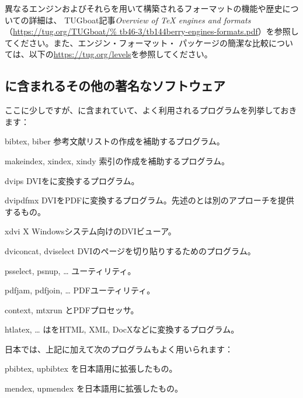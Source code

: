 \documentclass[uplatex,dvipdfmx,12pt,tombow]{jsarticle}
\begin{document}
異なるエンジンおよびそれらを用いて構築されるフォーマットの機能や歴史についての詳細は、
TUGboat記事\textsl{Overview of TeX engines and formats}（\url{https://tug.org/TUGboat/%
tb46-3/tb144berry-engines-formats.pdf}）を参照してください。また、エンジン・フォーマット・
パッケージの簡潔な比較については、以下の\url{https://tug.org/levels}を参照してください。

\subsection{\TL に含まれるその他の著名なソフトウェア}

ここに少しですが、\TL に含まれていて、よく利用されるプログラムを列挙しておきます：
%
\begin{cmddescription}
\item[bibtex, biber]
参考文献リストの作成を補助するプログラム。

\item[makeindex, xindex, xindy]
索引の作成を補助するプログラム。

\item[dvips]
DVIを\PS に変換するプログラム。

\item[dvipdfmx]
DVIをPDFに変換するプログラム。先述の\pdfTeX とは別のアプローチを提供するもの。

\item[xdvi]
X Windowsシステム向けのDVIビューア。

\item[dviconcat, dviselect]
DVIのページを切り貼りするためのプログラム。

\item[psselect, psnup, \ldots]
\PS ユーティリティ。

\item[pdfjam, pdfjoin, \ldots]
PDFユーティリティ。

\item[context, mtxrun]
\ConTeXt とPDFプロセッサ。

\item[htlatex, \ldots]
は\AllTeX をHTML, XML, DocXなどに変換するプログラム。
\end{cmddescription}

\begin{janote}
日本では、上記に加えて次のプログラムもよく用いられます：
%
\begin{cmddescription}
\item[pbibtex, upbibtex]
を日本語用に拡張したもの。

\item[mendex, upmendex]
を日本語用に拡張したもの。
\end{cmddescription}
\end{janote}
\end{document}
